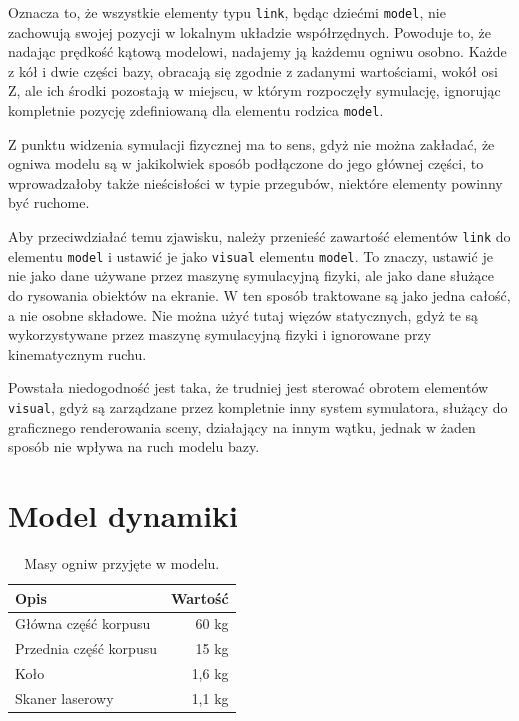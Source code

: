 		Oznacza to, że wszystkie elementy typu \texttt{link}, będąc dziećmi \texttt{model}, nie zachowują swojej pozycji w lokalnym układzie współrzędnych.
		Powoduje to, że nadając prędkość kątową modelowi, nadajemy ją każdemu ogniwu osobno.
		Każde z kół i dwie części bazy, obracają się zgodnie z zadanymi wartościami, wokół osi Z, ale ich środki pozostają w miejscu, w którym rozpoczęły symulację,
		ignorując kompletnie pozycję zdefiniowaną dla elementu rodzica \texttt{model}.
		
		Z punktu widzenia symulacji fizycznej ma to sens, gdyż nie można zakładać, że ogniwa modelu są w jakikolwiek sposób podłączone do jego głównej części, 
		to wprowadzałoby także nieścisłości w typie przegubów, niektóre elementy powinny być ruchome.

		Aby przeciwdziałać temu zjawisku, należy przenieść zawartość elementów \texttt{link} do elementu \texttt{model} i ustawić je jako \texttt{visual} elementu \texttt{model}.
		To znaczy, ustawić je nie jako dane używane przez maszynę symulacyjną fizyki, ale jako dane służące do rysowania obiektów na ekranie.
		W ten sposób traktowane są jako jedna całość, a nie osobne składowe.
		Nie można użyć tutaj więzów statycznych, gdyż te są wykorzystywane przez maszynę symulacyjną fizyki i ignorowane przy kinematycznym ruchu.

		Powstała niedogodność jest taka, że trudniej jest sterować obrotem elementów \texttt{visual}, gdyż są zarządzane przez kompletnie inny system symulatora,
		służący do graficznego renderowania sceny, działający na innym wątku, jednak w żaden sposób nie wpływa na ruch modelu bazy.
		
\section{Model dynamiki}
	\begin{table}
		\centering
		\begin{tabular}{l r}
		Opis & Wartość \\
		\hline
		Główna część korpusu	&	60 \si{\kilo\gram} \\
		Przednia część korpusu	&	15 \si{\kilo\gram} \\
		Koło					&	1,6 \si{\kilo\gram} \\
		Skaner laserowy			&	1,1 \si{\kilo\gram} \\
		\end{tabular}
		\caption{Masy ogniw przyjęte w modelu.}
		\label{tab:masses}
	\end{table}
	

